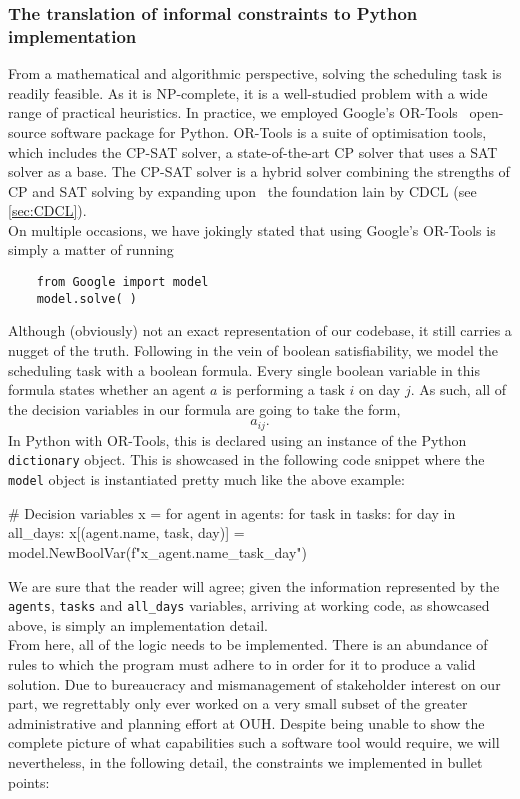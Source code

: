 \subsubsection*{The translation of informal constraints to Python implementation}
From a mathematical and algorithmic perspective, solving the scheduling task is readily feasible. As it is NP-complete, it is a well-studied problem with a wide range of practical heuristics. In practice, we employed Google's OR-Tools~\cite{Wiki-OR-Tools} open-source software package for Python. OR-Tools is a suite of optimisation tools, which includes the CP-SAT solver, a state-of-the-art CP solver that uses a SAT solver as a base. The CP-SAT solver is a hybrid solver combining the strengths of CP and SAT solving by expanding upon~\cite{Lazy-Clause-Generation} the foundation lain by CDCL (see \autoref{sec:CDCL}).
\\
On multiple occasions, we have jokingly stated that using Google's OR-Tools is simply a matter of running
\begin{verbatim}
    from Google import model
    model.solve( )
\end{verbatim}
Although (obviously) not an exact representation of our codebase, it still carries a nugget of the truth. Following in the vein of boolean satisfiability, we model the scheduling task with a boolean formula. Every single boolean variable in this formula states whether an agent \(a\) is performing a task \(i\) on day \(j\). As such, all of the decision variables in our formula are going to take the form,
\begin{equation}\label{eq:decision-variable-form}
	a_{ij}.
\end{equation}
In Python with OR-Tools, this is declared using an instance of the Python \texttt{dictionary} object. This is showcased in the following code snippet where the \texttt{model} object is instantiated pretty much like the above example:
\begin{python}
# Decision variables
x = {}
for agent in agents:
    for task in tasks:
        for day in all_days:
            x[(agent.name, task, day)] = model.NewBoolVar(f"x_{agent.name}_{task}_{day}")
\end{python}
We are sure that the reader will agree; given the information represented by the \texttt{agents}, \texttt{tasks} and \texttt{all_days} variables, arriving at working code, as showcased above, is simply an implementation detail.
\\
From here, all of the logic needs to be implemented. There is an abundance of rules to which the program must adhere to in order for it to produce a valid solution. Due to bureaucracy and mismanagement of stakeholder interest on our part, we regrettably only ever worked on a very small subset of the greater administrative and planning effort at OUH. Despite being unable to show the complete picture of what capabilities such a software tool would require, we will nevertheless, in the following detail, the constraints we implemented in bullet points:
